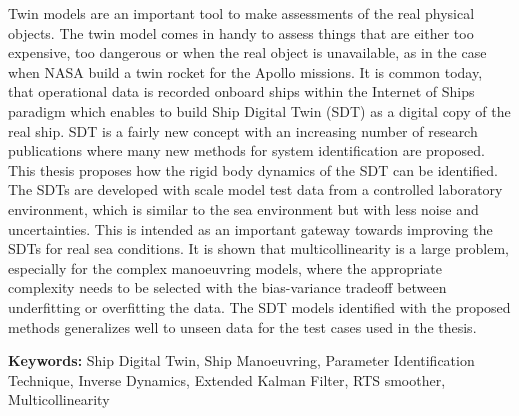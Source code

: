 
Twin models are an important tool to make assessments of the real physical objects. The twin model comes in handy to assess things that are either too expensive, too dangerous or when the real object is unavailable, as in the case when NASA build a twin rocket for the Apollo missions. 
It is common today, that operational data is recorded onboard ships within the Internet of Ships paradigm which enables to build Ship Digital Twin (SDT) as a digital copy of the real ship. SDT is a fairly new concept with an increasing number of research publications where many new methods for system identification are proposed.
\noindent This thesis proposes how the rigid body dynamics of the SDT can be identified. 
\noindent The SDTs are developed with scale model test data from a controlled laboratory environment, which is similar to the sea environment but with less noise and uncertainties. This is intended as an important gateway towards improving the SDTs for real sea conditions. 
\noindent It is shown that multicollinearity is a large problem, especially for the complex manoeuvring models, where the appropriate complexity needs to be selected with the bias-variance tradeoff between underfitting or overfitting the data.
\noindent The SDT models identified with the proposed methods generalizes well to unseen data for the test cases used in the thesis.

\vspace{0.1cm}
\textbf{Keywords:} Ship Digital Twin, Ship Manoeuvring, Parameter Identification Technique, Inverse Dynamics, Extended Kalman Filter, RTS smoother, Multicollinearity

